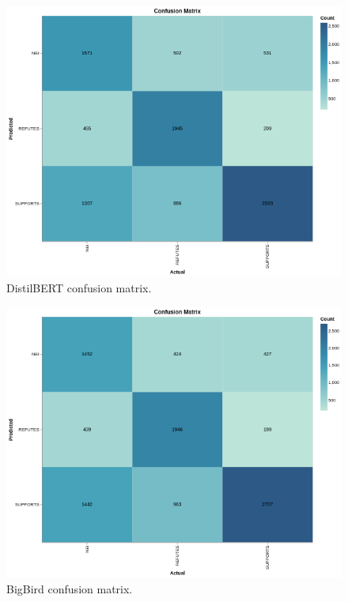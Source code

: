 \documentclass[conference]{IEEEtran}
\begin{document}
\begin{appendices}
\begin{figure}[htp]
    \centering
    \includegraphics[scale=0.5]{cm_distilbert.png}\hfill
    \caption{DistilBERT confusion matrix.}
    \label{fig:cm_distilbert}
\end{figure}

\begin{figure}[htp]
    \centering
    \includegraphics[scale=0.5]{cm_bigbird.png}\hfill
    \caption{BigBird confusion matrix.}
    \label{fig:cm_bigbird}
\end{figure}


\end{appendices}
\end{document}
